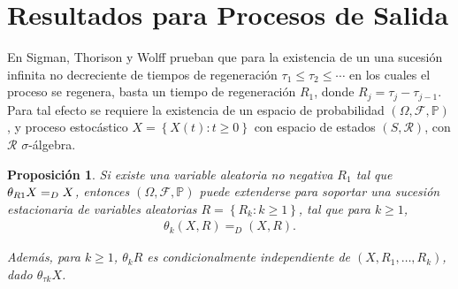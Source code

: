 \documentclass{article}
\newtheorem{Prop}{Proposición}
\newcommand{\prob}{\mathbb{P}}
\begin{document}
\section{Resultados para Procesos de Salida}

En Sigman, Thorison y Wolff \cite{Sigman2} prueban que para la existencia de un una sucesi\'on infinita no decreciente de tiempos de regeneraci\'on $\tau_{1}\leq\tau_{2}\leq\cdots$ en los cuales el proceso se regenera, basta un tiempo de regeneraci\'on $R_{1}$, donde $R_{j}=\tau_{j}-\tau_{j-1}$. Para tal efecto se requiere la existencia de un espacio de probabilidad $\left(\Omega,\mathcal{F},\prob\right)$, y proceso estoc\'astico $\textit{X}=\left\{X\left(t\right):t\geq0\right\}$ con espacio de estados $\left(S,\mathcal{R}\right)$, con $\mathcal{R}$ $\sigma$-\'algebra.

\begin{Prop}
Si existe una variable aleatoria no negativa $R_{1}$ tal que $\theta_{R\footnotesize{1}}X=_{D}X$, entonces $\left(\Omega,\mathcal{F},\prob\right)$ puede extenderse para soportar una sucesi\'on estacionaria de variables aleatorias $R=\left\{R_{k}:k\geq1\right\}$, tal que para $k\geq1$,
\begin{eqnarray*}
\theta_{k}\left(X,R\right)=_{D}\left(X,R\right).
\end{eqnarray*}

Adem\'as, para $k\geq1$, $\theta_{k}R$ es condicionalmente independiente de $\left(X,R_{1},\ldots,R_{k}\right)$, dado $\theta_{\tau k}X$.

\end{Prop}
\end{document}

